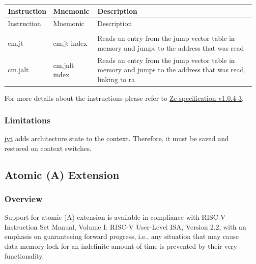 \documentclass[main\_\_EN.tex]{subfiles}
\begin{document}
\begin{longtable}{ | p{2.0cm} | p{4.0cm} |  p{10.0cm} | }
\hline\rowcolor{lightgray}
Instruction & Mnemonic & Description  \\ \hline
\endfirsthead
\hline
\rowcolor{lightgray}
Instruction & Mnemonic & Description  \\ \hline
\hline
\endhead
\endfoot




\multicolumn{3}{|l|}{\textbf{Zcmt extension}} \\\hline

cm.jt & cm.jt index & Reads an entry from the jump vector table in memory and jumps to the address that was read \\\hline
cm.jalt & cm.jalt index & Reads an entry from the jump vector table in memory and jumps to the address that was read, linking to ra  \\\hline

\end{longtable}

For more details about the instructions please refer to \href{https://github.com/riscvarchive/riscv-code-size-reduction/blob/v1.0.4-3/Zc-specification/Zc.adoc}{Zc-specification v1.0.4-3}.

\subsubsection{Limitations}
\label{sec:riscvcpu-zc-limit-descr}

\hyperref[regdesc:JVT]{jvt} adds architecture state to the context. Therefore, it must be saved and restored on context switches.


\newpage
\subsection{Atomic (A) Extension}
\label{sec:riscvcpu-atomic}

\subsubsection{Overview}
\label{sec:riscvcpu-atomic-overview}

Support for atomic (A) extension is available in compliance with RISC-V Instruction Set Manual, Volume I: RISC-V User-Level ISA, Version 2.2, with an emphasis on guaranteeing forward progress, i.e., any situation that may cause data memory lock for an indefinite amount of time is prevented by their very functionality.
\end{document}
